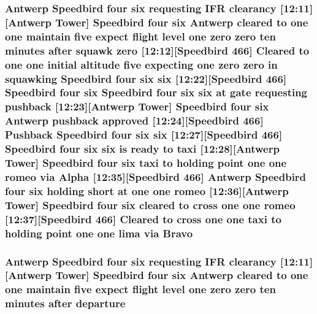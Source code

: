 \subsubsection[{\texorpdfstring{Bravo}{Bravo}}]{\setlength{\rightskip}{0pt plus 5cm}Antwerp Speedbird four {\bf six} requesting I\+FR clearancy \mbox{[}12\+:11\mbox{]}\mbox{[}Antwerp {\bf Tower}\mbox{]} Speedbird four {\bf six} Antwerp cleared to {\bf one} {\bf one} maintain five expect flight level {\bf one} {\bf zero} {\bf zero} {\bf ten} minutes after squawk {\bf zero} \mbox{[}12\+:12\mbox{]}\mbox{[}Speedbird 466\mbox{]} Cleared to {\bf one} {\bf one} initial altitude five expecting {\bf one} {\bf zero} {\bf zero} in {\bf squawking} Speedbird four {\bf six} {\bf six} \mbox{[}12\+:22\mbox{]}\mbox{[}Speedbird 466\mbox{]} Speedbird four {\bf six} Speedbird four {\bf six} {\bf six} at gate requesting pushback \mbox{[}12\+:23\mbox{]}\mbox{[}Antwerp {\bf Tower}\mbox{]} Speedbird four {\bf six} Antwerp pushback {\bf approved} \mbox{[}12\+:24\mbox{]}\mbox{[}Speedbird 466\mbox{]} Pushback Speedbird four {\bf six} {\bf six} \mbox{[}12\+:27\mbox{]}\mbox{[}Speedbird 466\mbox{]} Speedbird four {\bf six} {\bf six} is ready to taxi \mbox{[}12\+:28\mbox{]}\mbox{[}Antwerp {\bf Tower}\mbox{]} Speedbird four {\bf six} taxi to holding point {\bf one} {\bf one} {\bf romeo} via {\bf Alpha} \mbox{[}12\+:35\mbox{]}\mbox{[}Speedbird 466\mbox{]} Antwerp Speedbird four {\bf six} holding short at {\bf one} {\bf one} {\bf romeo} \mbox{[}12\+:36\mbox{]}\mbox{[}Antwerp {\bf Tower}\mbox{]} Speedbird four {\bf six} cleared to cross {\bf one} {\bf one} {\bf romeo} \mbox{[}12\+:37\mbox{]}\mbox{[}Speedbird 466\mbox{]} Cleared to cross {\bf one} {\bf one} taxi to holding point {\bf one} {\bf one} {\bf lima} via Bravo}\hypertarget{happyDay4ExpectedATC_8txt_ace27fd0bdc1b0da536a70f89116c159c}{}\label{happyDay4ExpectedATC_8txt_ace27fd0bdc1b0da536a70f89116c159c}
\subsubsection[{\texorpdfstring{departure}{departure}}]{\setlength{\rightskip}{0pt plus 5cm}Antwerp Speedbird four {\bf six} requesting I\+FR clearancy \mbox{[}12\+:11\mbox{]}\mbox{[}Antwerp {\bf Tower}\mbox{]} Speedbird four {\bf six} Antwerp cleared to {\bf one} {\bf one} maintain five expect flight level {\bf one} {\bf zero} {\bf zero} {\bf ten} minutes after departure}\hypertarget{happyDay4ExpectedATC_8txt_af9835824e50bb6ca59bed75129f137e3}{}\label{happyDay4ExpectedATC_8txt_af9835824e50bb6ca59bed75129f137e3}

